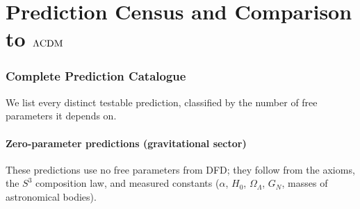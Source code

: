 \documentclass[11pt]{article}
\newcommand{\GN}{G_N}
\newcommand{\LCDM}{\Lambda{\rm CDM}}
\newcommand{\Hzero}{H_0}
\newcommand{\OmL}{\Omega_\Lambda}
\begin{document}
\newpage
\part{Prediction Census and Comparison to $\LCDM$}
\label{part:predictions}

\section{Complete Prediction Catalogue}
\label{sec:prediction-catalogue}

We list every distinct testable prediction, classified by the number
of free parameters it depends on.

\subsection{Zero-parameter predictions (gravitational sector)}

These predictions use no free parameters from DFD; they follow from
the axioms, the $S^3$ composition law, and measured constants
($\alpha$, $\Hzero$, $\OmL$, $\GN$, masses of astronomical bodies).
\end{document}
